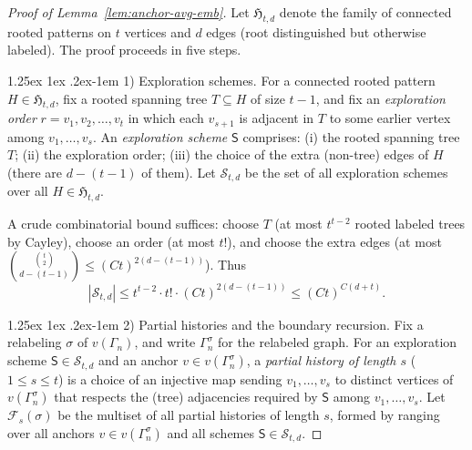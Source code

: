 \documentclass[10pt,a4paper]{amsart}
\makeatletter
\renewcommand{\paragraph}{%
  \@startsection{paragraph}{4}%
  {\z@}{1.25ex \@plus 1ex \@minus .2ex}{-1em}%
  {\normalfont\normalsize\bfseries}%
}
\makeatother
\begin{document}
\begin{proof}[Proof of Lemma~\ref{lem:anchor-avg-emb}] Let $\mathfrak H_{t,d}$ denote the family of connected rooted patterns on $t$ vertices and $d$ edges (root distinguished but otherwise labeled). The proof proceeds in five steps.

\paragraph{1) Exploration schemes.}
For a connected rooted pattern $H\in\mathfrak H_{t,d}$, fix a rooted spanning tree $T\subseteq H$ of size $t-1$, and fix an \emph{exploration order} $r=v_1,v_2,\dots,v_t$ in which each $v_{s+1}$ is adjacent in $T$ to some earlier vertex among $v_1,\dots,v_s$.
An \emph{exploration scheme} $\mathsf S$ comprises:
(i) the rooted spanning tree $T$;
(ii) the exploration order;
(iii) the choice of the extra (non-tree) edges of $H$ (there are $d-(t-1)$ of them).
Let $\mathcal S_{t,d}$ be the set of all exploration schemes over all $H\in\mathfrak H_{t,d}$.

A crude combinatorial bound suffices:
choose $T$ (at most $t^{  t-2}$ rooted labeled trees by Cayley),
choose an order (at most $t!$),
and choose the extra edges (at most $\binom{\binom{t}{2}}{d-(t-1)}\le (Ct)^{  2(d-(t-1))}$).
Thus
\begin{equation}\label{eq:scheme-count}
|\mathcal S_{t,d}|
\leq 
t^{  t-2}\cdot t!\cdot (Ct)^{  2(d-(t-1))}
\leq  (Ct)^{  C(d+t)}.
\end{equation}

\paragraph{2) Partial histories and the boundary recursion.}
Fix a relabeling $\sigma$ of $v(\Gamma_n)$, and write $\Gamma_n^\sigma$ for the relabeled graph.
For an exploration scheme $\mathsf S\in\mathcal S_{t,d}$ and an anchor $v\in v(\Gamma_n^\sigma)$, a \emph{partial history of length $s$} ($1\le s\le t$)
is a choice of an injective map sending $v_1,\dots,v_s$ to distinct vertices of $v(\Gamma_n^\sigma)$ that respects the (tree) adjacencies required by $\mathsf S$ among $v_1,\dots,v_s$.
Let $\mathcal F_s(\sigma)$ be the multiset of all partial histories of length $s$, formed by ranging over all anchors $v\in v(\Gamma_n^\sigma)$ and all schemes $\mathsf S\in\mathcal S_{t,d}$.


\end{proof}
\end{document}
